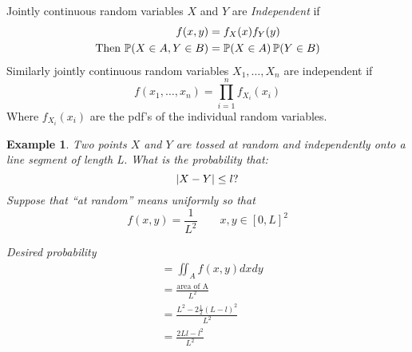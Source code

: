 \documentclass{notes}
\theoremstyle{plain}
\newtheorem*{example}{Example}
\newcommand{\bP}{\mathbb{P}}
\newcommand{\prob}[1]{\bP \negthinspace\left(#1\right)}
\begin{document}
Jointly continuous random variables $X$ and $Y$ are \emph{Independent}
if
\begin{align*}
f(x,y) &= f_X(x)f_Y(y)\\
\text{Then } \prob{X \in A, Y \in B} &= \prob{X \in A} \prob{Y \in B}\\
\end{align*}
Similarly jointly continuous random variables $X_1,\dots, X_n$
are independent if
\[
f(x_1,\dots,x_n) = \prod_{i=1}^n f_{X_i}(x_i)
\]
Where $ f_{X_i}(x_i)$ are the pdf's of the individual random
variables.

\vspace{3in}

\begin{example}
Two points $X$ and $Y$ are tossed at random and independently onto a
line segment of length L. What is the probability that:
\[
\left|X-Y\right| \leq l \text{?}
\]
Suppose that ``at random'' means uniformly so that
\[
f(x,y) = \frac{1}{L^2} \qquad x,y  \in [0,L]^2
\]

\vspace{3in}

Desired probability 
\begin{align*}
&= \iint_{A}f(x,y)dxdy\\
&= \frac {\text{area of A}}{L^2}\\
&= \frac{L^2-2\frac{1}{2}(L-l)^2}{L^2}\\
&= \frac{2Ll - l^2}{L^2}
\end{align*}
\end{example}
\end{document}

